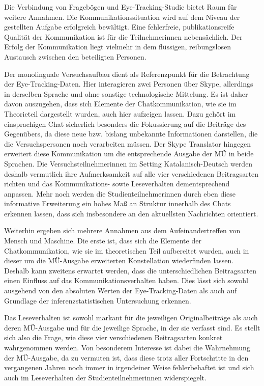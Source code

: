 Die Verbindung von Fragebögen und Eye-Tracking-Studie bietet Raum für weitere Annahmen. Die Kommunikationssituation wird auf dem Niveau der gestellten Aufgabe erfolgreich bewältigt. Eine fehlerfreie, publikationsreife Qualität der Kommunikation ist für die Teilnehmer{\textperiodcentered}innen nebensächlich. Der Erfolg der Kommunikation liegt vielmehr in dem flüssigen, reibungslosen Austausch zwischen den beteiligten Personen. 

Der monolinguale Versuchsaufbau dient als Referenzpunkt für die Betrachtung der Eye-Tracking-Daten. Hier interagieren zwei Personen über Skype, allerdings in derselben Sprache und ohne sonstige technologische Mittelung. Es ist daher davon auszugehen, dass sich Elemente der Chatkommunikation, wie sie im Theorieteil dargestellt wurden, auch hier aufzeigen lassen. Dazu gehört im einsprachigen Chat sicherlich besonders die Fokussierung auf die Beiträge des Gegenübers, da diese neue bzw. bislang unbekannte Informationen darstellen, die die Versuchspersonen noch verarbeiten müssen. Der Skype Translator hingegen erweitert diese Kommunikation um die entsprechende Ausgabe der MÜ in beide Sprachen. Die Versuchsteilnehmer{\textperiodcentered}innen im Setting Katalanisch-Deutsch werden deshalb vermutlich ihre Aufmerksamkeit auf alle vier verschiedenen Beitragsarten richten und das Kommunikations- sowie Leseverhalten dementsprechend anpassen. Mehr noch werden die Studienteilnehmer{\textperiodcentered}innen durch eben diese informative Erweiterung ein hohes Maß an Struktur innerhalb des Chats erkennen lassen, dass sich insbesondere an den aktuellsten Nachrichten orientiert.   

Weiterhin ergeben sich mehrere Annahmen aus dem Aufeinandertreffen von Mensch und Maschine. Die erste ist, dass sich die Elemente der Chatkommunikation, wie sie im theoretischen Teil aufbereitet wurden, auch in dieser um die MÜ-Ausgabe erweiterten Konstellation wiederfinden lassen. Deshalb kann zweitens erwartet werden, dass die unterschiedlichen Beitragsarten einen Einfluss auf das Kommunikationsverhalten haben. Dies lässt sich sowohl ausgehend von den absoluten Werten der Eye-Tracking-Daten als auch auf Grundlage der inferenzstatistischen Untersuchung erkennen. 

Das Leseverhalten ist sowohl markant für die jeweiligen Originalbeiträge als auch deren MÜ-Ausgabe und für die jeweilige Sprache, in der sie verfasst sind. Es stellt sich also die Frage, wie diese vier verschiedenen Beitragsarten konkret wahrgenommen werden. Von besonderem Interesse ist dabei die Wahrnehmung der MÜ-Ausgabe, da zu vermuten ist, dass diese trotz aller Fortschritte in den vergangenen Jahren noch immer in irgendeiner Weise fehlerbehaftet ist und sich auch im Leseverhalten der Studienteilnehmer{\textperiodcentered}innen widerspiegelt.

